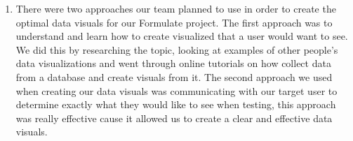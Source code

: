\documentclass[12pt, titlepage]{article}
\begin{document}
\begin{enumerate}
    \item There were two approaches our team planned to use in order to create the optimal data visuals for our Formulate project. The first approach was to understand and learn how to create visualized that a user would want to see. We did this by researching the topic, looking at examples of other people's data visualizations and went through online tutorials on how collect data from a database and create visuals from it. The second approach we used when creating our data visuals was communicating with our target user to determine exactly what they would like to see when testing, this approach was really effective cause it allowed us to create a clear and effective data visuals.
  \end{enumerate}


\end{document}
